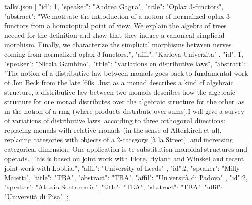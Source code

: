 \begin{filecontents*}{talks.json}
[{
  "id": 1,
  "speaker": "Andrea Gagna",
  "title": "Oplax 3-functors",
  "abstract": "We motivate the introduction of a notion of normalized oplax 3-functors from a homotopical point of view. We explain the algebra of trees needed for the definition and show that they induce a canonical simplicial morphism. Finally, we characterize the simplicial morphisms between nerves coming from normalized oplax 3-functors.",
  "affil": "Karlova Univerzita"
},
{
  "id": 1,
  "speaker": "Nicola Gambino",
  "title": "Variations on distributive laws",
  "abstract": "The notion of a distributive law between monads goes back to fundamental work of Jon Beck from the late '60s. Just as a monad describes a kind of algebraic structure, a distributive law between two monads describes how the algebraic structure for one monad distributes over the algebraic structure for the other, as in the notion of a ring (where products distribute over sums).\n\n I will give a survey of variations of distributive laws, according to three orthogonal directions: replacing monads with relative monads (in the sense of Altenkirch et al), replacing categories with objects of a 2-category (à la Street), and increasing categorical dimension. One application is to substitution monoidal structures and operads. This is based on joint work with Fiore, Hyland and Winskel and recent joint work with Lobbia.",
  "affil": "University of Leeds"
},
{
  "id":2,
  "speaker": "Milly Maietti",
  "title": "TBA",
  "abstract": "TBA",
  "affil": "Università di Padova"
},
{
  "id":2,
  "speaker": "Alessio Santamaria",
  "title": "TBA",
  "abstract": "TBA",
  "affil": "Università di Pisa"
}];
\end{filecontents*}